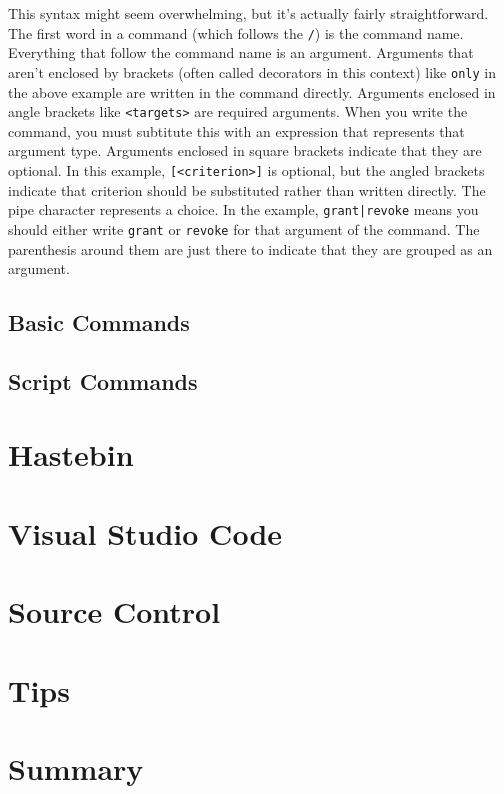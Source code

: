 \documentclass[oneside]{book}
\begin{document}
This syntax might seem overwhelming, but it's actually fairly straightforward. The first word in a command (which follows the \texttt{/}) is the command name. Everything that follow the command name is an argument. Arguments that aren't enclosed by brackets (often called decorators in this context) like \texttt{only} in the above example are written in the command directly. Arguments enclosed in angle brackets like \texttt{<targets>} are required arguments. When you write the command, you must subtitute this with an expression that represents that argument type. Arguments enclosed in square brackets indicate that they are optional. In this example, \texttt{[<criterion>]} is optional, but the angled brackets indicate that criterion should be substituted rather than written directly. The pipe character represents a choice. In the example, \texttt{grant|revoke} means you should either write \texttt{grant} or \texttt{revoke} for that argument of the command. The parenthesis around them are just there to indicate that they are grouped as an argument.

\subsection{Basic Commands}

\subsection{Script Commands}

\section{Hastebin}
\blindtext

\section{Visual Studio Code}
\blindtext

\section{Source Control}
\blindtext

\section{Tips}
\blindtext

\section{Summary}
\blindtext
\end{document}
